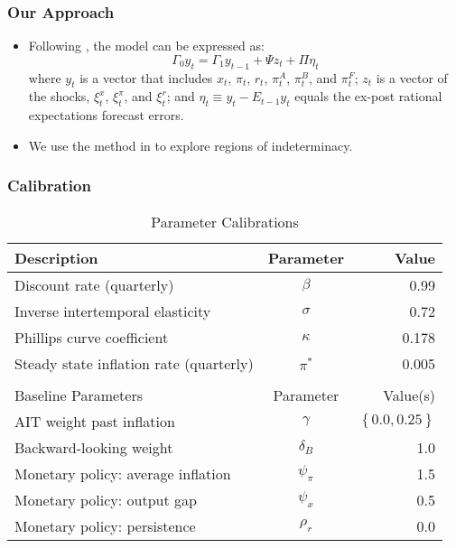 \documentclass{beamer}
\begin{document}
\begin{frame}
	\frametitle{Our Approach}
	\begin{itemize}
		\setlength{\itemsep}{1em}
		\item Following \citet{sims2002}, the model can be expressed as:
		\begin{equation}
			\Gamma_0 y_t = \Gamma_1 y_{t-1} + \Psi z_t + \Pi \eta_t
		\end{equation}
		where $y_t$ is a vector that includes $x_t$, $\pi_t$, $r_t$, $\pi_t^A$, $\pi_t^B$, and $\pi_t^F$; $z_t$ is a vector of the shocks, $\xi_t^x$, $\xi_t^\pi$, and $\xi_t^r$; and $\eta_t \equiv y_t - E_{t-1} y_t$ equals the ex-post rational expectations forecast errors. 
		\item We use the method in \citet{sims2002} to explore regions of indeterminacy.
	\end{itemize}
\end{frame}

\begin{frame}
	\frametitle{Calibration}
	\begin{table}[htp]
		\begin{center}
			\vspace*{-1pc}\begin{tabular}{lcr}
				Description & Parameter & Value \\ \hline
				Discount rate (quarterly) & $\beta$ & 0.99 \\
				Inverse intertemporal elasticity & $\sigma$ & 0.72 \\
				Phillips curve coefficient & $\kappa$ & 0.178 \\
				Steady state inflation rate (quarterly) & $\pi^*$ & 0.005 \\ [0.25pc]
				\hline \\ [-0.25pc]
				Baseline Parameters & Parameter & Value(s) \\ \hline
				AIT weight past inflation & $\gamma$ & $\left\{ 0.0, 0.25 \right\}$ \\
				Backward-looking weight & $\delta_B$ & 1.0 \\
				Monetary policy: average inflation & $\psi_\pi$ & 1.5 \\
				Monetary policy: output gap & $\psi_x$ & 0.5 \\
				Monetary policy: persistence & $\rho_r$ & 0.0 \\ \hline
			\end{tabular}
		\end{center}
	\captionsetup{justification=centering}
	\caption{Parameter Calibrations}\label{tb:parms}
	\end{table}
\end{frame}
\end{document}
